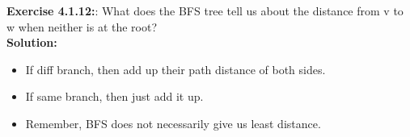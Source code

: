 \documentclass[11pt,fleqn]{article}
\begin{document}
\textbf{Exercise 4.1.12:}: What does the BFS tree tell us about the
distance from v to w when neither is at the root?\\

\textbf{Solution:}
\begin{itemize}
	\item If diff branch, then add up their path distance of both sides.
	\item If same branch, then just add it up.
	\item Remember, BFS does not necessarily give us least distance.
\end{itemize}


	
\end{document}
